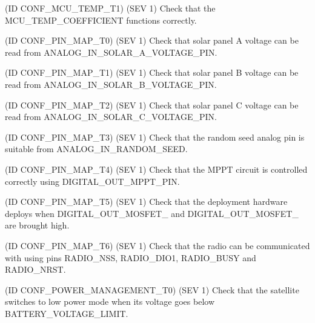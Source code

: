 \begin{DoxyRefList}
(ID C\+O\+N\+F\+\_\+\+M\+C\+U\+\_\+\+T\+E\+M\+P\+\_\+\+T1) (S\+EV 1) Check that the M\+C\+U\+\_\+\+T\+E\+M\+P\+\_\+\+C\+O\+E\+F\+F\+I\+C\+I\+E\+NT functions correctly. 
\item[\label{test__test000022}%
\Hypertarget{test__test000022}%
Module \hyperlink{group__defines__pin__map}{defines\+\_\+pin\+\_\+map} ](ID C\+O\+N\+F\+\_\+\+P\+I\+N\+\_\+\+M\+A\+P\+\_\+\+T0) (S\+EV 1) Check that solar panel A voltage can be read from A\+N\+A\+L\+O\+G\+\_\+\+I\+N\+\_\+\+S\+O\+L\+A\+R\+\_\+\+A\+\_\+\+V\+O\+L\+T\+A\+G\+E\+\_\+\+P\+IN. 

(ID C\+O\+N\+F\+\_\+\+P\+I\+N\+\_\+\+M\+A\+P\+\_\+\+T1) (S\+EV 1) Check that solar panel B voltage can be read from A\+N\+A\+L\+O\+G\+\_\+\+I\+N\+\_\+\+S\+O\+L\+A\+R\+\_\+\+B\+\_\+\+V\+O\+L\+T\+A\+G\+E\+\_\+\+P\+IN. 

(ID C\+O\+N\+F\+\_\+\+P\+I\+N\+\_\+\+M\+A\+P\+\_\+\+T2) (S\+EV 1) Check that solar panel C voltage can be read from A\+N\+A\+L\+O\+G\+\_\+\+I\+N\+\_\+\+S\+O\+L\+A\+R\+\_\+\+C\+\_\+\+V\+O\+L\+T\+A\+G\+E\+\_\+\+P\+IN. 

(ID C\+O\+N\+F\+\_\+\+P\+I\+N\+\_\+\+M\+A\+P\+\_\+\+T3) (S\+EV 1) Check that the random seed analog pin is suitable from A\+N\+A\+L\+O\+G\+\_\+\+I\+N\+\_\+\+R\+A\+N\+D\+O\+M\+\_\+\+S\+E\+ED. 

(ID C\+O\+N\+F\+\_\+\+P\+I\+N\+\_\+\+M\+A\+P\+\_\+\+T4) (S\+EV 1) Check that the M\+P\+PT circuit is controlled correctly using D\+I\+G\+I\+T\+A\+L\+\_\+\+O\+U\+T\+\_\+\+M\+P\+P\+T\+\_\+\+P\+IN. 

(ID C\+O\+N\+F\+\_\+\+P\+I\+N\+\_\+\+M\+A\+P\+\_\+\+T5) (S\+EV 1) Check that the deployment hardware deploys when D\+I\+G\+I\+T\+A\+L\+\_\+\+O\+U\+T\+\_\+\+M\+O\+S\+F\+E\+T\+\_ and D\+I\+G\+I\+T\+A\+L\+\_\+\+O\+U\+T\+\_\+\+M\+O\+S\+F\+E\+T\+\_ are brought high. 

(ID C\+O\+N\+F\+\_\+\+P\+I\+N\+\_\+\+M\+A\+P\+\_\+\+T6) (S\+EV 1) Check that the radio can be communicated with using pins R\+A\+D\+I\+O\+\_\+\+N\+SS, R\+A\+D\+I\+O\+\_\+\+D\+I\+O1, R\+A\+D\+I\+O\+\_\+\+B\+U\+SY and R\+A\+D\+I\+O\+\_\+\+N\+R\+ST. 
\item[\label{test__test000017}%
\Hypertarget{test__test000017}%
Module \hyperlink{group__defines__power__management__configuration}{defines\+\_\+power\+\_\+management\+\_\+configuration} ](ID C\+O\+N\+F\+\_\+\+P\+O\+W\+E\+R\+\_\+\+M\+A\+N\+A\+G\+E\+M\+E\+N\+T\+\_\+\+T0) (S\+EV 1) Check that the satellite switches to low power mode when its voltage goes below B\+A\+T\+T\+E\+R\+Y\+\_\+\+V\+O\+L\+T\+A\+G\+E\+\_\+\+L\+I\+M\+IT. 


\end{DoxyRefList}
